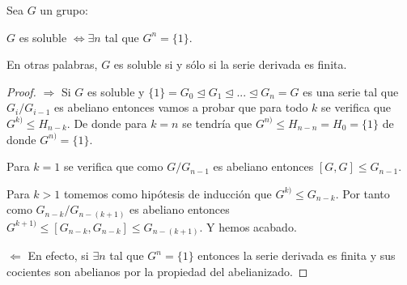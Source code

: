 \begin{theorem}
Sea $G$ un grupo:

$G$ es soluble $\iff \exists n $ tal que $G^{n} = \{1\}$.

En otras palabras, $G$ es soluble si y sólo si la serie derivada es finita.
\end{theorem}
\begin{proof}
$\Rightarrow$ Si $G$ es soluble y $\{1\} = G_0 \trianglelefteq G_1 \trianglelefteq ... \trianglelefteq G_n = G$ es una serie tal que $G_i/G_{i-1}$ es abeliano entonces vamos a probar que para todo $k$ se verifica que $G^{k)} \le H_{n-k}$. De donde para $k = n$ se tendría que $G^{n)} \le H_{n-n} = H_0 = \{1\}$ de donde $G^{n)} = \{1\}$.

Para $k = 1$ se verifica que como $G/G_{n-1}$ es abeliano entonces $[G,G]  \le G_{n-1}$. 

Para $k > 1$ tomemos como hipótesis de inducción que $G^{k)} \le G_{n-k}$. Por tanto como $G_{n-k}/G_{n-(k+1)}$ es abeliano entonces $G^{k+1)} \le [G_{n-k},G_{n-k}] \le G_{n-(k+1)}$. Y hemos acabado.

$\Leftarrow$ En efecto, si $\exists n $ tal que $G^{n} = \{1\}$ entonces la serie derivada es finita y sus cocientes son abelianos por la propiedad del abelianizado.
\end{proof}
